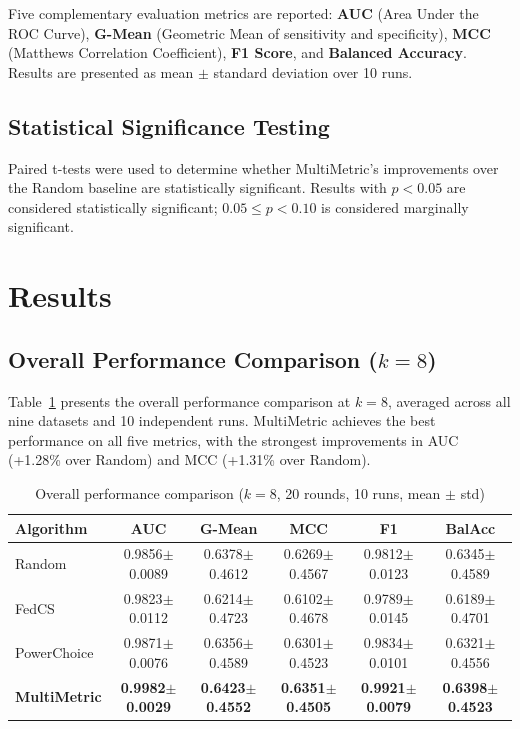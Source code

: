 Five complementary evaluation metrics are reported: \textbf{AUC} (Area Under the ROC Curve), \textbf{G-Mean} (Geometric Mean of sensitivity and specificity), \textbf{MCC} (Matthews Correlation Coefficient), \textbf{F1 Score}, and \textbf{Balanced Accuracy}. Results are presented as mean $\pm$ standard deviation over 10 runs.

\subsection{Statistical Significance Testing}

Paired t-tests \citep{dietterich1998approximate} were used to determine whether MultiMetric's improvements over the Random baseline are statistically significant. Results with $p < 0.05$ are considered statistically significant; $0.05 \le p < 0.10$ is considered marginally significant.

\section{Results}

\subsection{Overall Performance Comparison ($k=8$)}

Table~\ref{tab:overall} presents the overall performance comparison at $k=8$, averaged across all nine datasets and 10 independent runs. MultiMetric achieves the best performance on all five metrics, with the strongest improvements in AUC (+1.28\% over Random) and MCC (+1.31\% over Random).

\begin{table}[htbp]
\centering
\caption{Overall performance comparison ($k=8$, 20 rounds, 10 runs, mean $\pm$ std)}
\label{tab:overall}
\begin{tabular}{|l|c|c|c|c|c|}
\hline
\textbf{Algorithm} & \textbf{AUC} & \textbf{G-Mean} & \textbf{MCC} & \textbf{F1} & \textbf{BalAcc} \\
\hline
Random      & 0.9856$\pm$0.0089 & 0.6378$\pm$0.4612 & 0.6269$\pm$0.4567 & 0.9812$\pm$0.0123 & 0.6345$\pm$0.4589 \\
FedCS       & 0.9823$\pm$0.0112 & 0.6214$\pm$0.4723 & 0.6102$\pm$0.4678 & 0.9789$\pm$0.0145 & 0.6189$\pm$0.4701 \\
PowerChoice & 0.9871$\pm$0.0076 & 0.6356$\pm$0.4589 & 0.6301$\pm$0.4523 & 0.9834$\pm$0.0101 & 0.6321$\pm$0.4556 \\
\textbf{MultiMetric} & \textbf{0.9982$\pm$0.0029} & \textbf{0.6423$\pm$0.4552} & \textbf{0.6351$\pm$0.4505} & \textbf{0.9921$\pm$0.0079} & \textbf{0.6398$\pm$0.4523} \\
\hline
\end{tabular}
\end{table}

